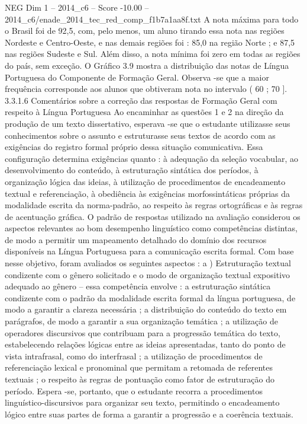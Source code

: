 \begin{textsample}{NEG Dim 1 – 2014\_c6 – Score -10.00 – 2014\_c6/enade\_2014\_tec\_red\_comp\_f1b7a1aa8f.txt}
A nota máxima para todo o Brasil foi de 92,5, com, pelo menos, um aluno tirando essa nota nas regiões Nordeste e Centro-Oeste, e nas demais regiões foi : 85,0 na região Norte ; e 87,5 nas regiões Sudeste e Sul.
Além disso, a nota mínima foi zero em todas as regiões do país, sem exceção.
O Gráfico 3.9 mostra a distribuição das notas de Língua Portuguesa do Componente de Formação Geral.
Observa -se que a maior frequência corresponde aos alunos que obtiveram nota no intervalo ( 60 ; 70 ]. 3.3.1.6 Comentários sobre a correção das respostas de Formação Geral com respeito à Língua Portuguesa Ao encaminhar as questões 1 e 2 na direção da produção de um texto dissertativo, esperava -se que o estudante utilizasse seus conhecimentos sobre o assunto e estruturasse seus textos de acordo com as exigências do registro formal próprio dessa situação comunicativa.
Essa configuração determina exigências quanto : à adequação da seleção vocabular, ao desenvolvimento do conteúdo, à estruturação sintática dos períodos, à organização lógica das ideias, à utilização de procedimentos de encadeamento textual e referenciação, à obediência às exigências morfossintáticas próprias da modalidade escrita da norma-padrão, ao respeito às regras ortográficas e às regras de acentuação gráfica.
O padrão de respostas utilizado na avaliação considerou os aspectos relevantes ao bom desempenho linguístico como competências distintas, de modo a permitir um mapeamento detalhado do domínio dos recursos disponíveis na Língua Portuguesa para a comunicação escrita formal.
Com base nesse objetivo, foram avaliados os seguintes aspectos : a ) Estruturação textual condizente com o gênero solicitado e o modo de organização textual expositivo adequado ao gênero – essa competência envolve : a estruturação sintática condizente com o padrão da modalidade escrita formal da língua portuguesa, de modo a garantir a clareza necessária ; a distribuição do conteúdo do texto em parágrafos, de modo a garantir a sua organização temática ; a utilização de operadores discursivos que contribuam para a progressão temática do texto, estabelecendo relações lógicas entre as ideias apresentadas, tanto do ponto de vista intrafrasal, como do interfrasal ; a utilização de procedimentos de referenciação lexical e pronominal que permitam a retomada de referentes textuais ; o respeito às regras de pontuação como fator de estruturação do período.
Espera -se, portanto, que o estudante recorra a procedimentos linguístico-discursivos para organizar seu texto, permitindo o encadeamento lógico entre suas partes de forma a garantir a progressão e a coerência textuais.

\end{textsample}
